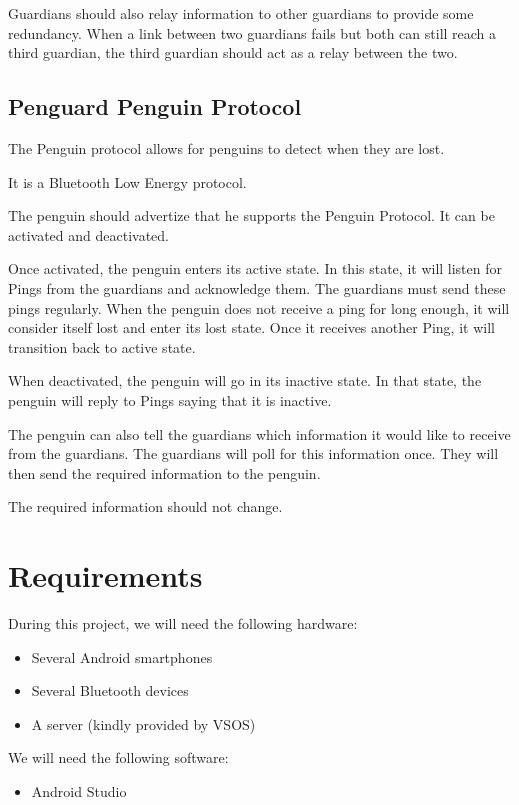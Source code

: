 \documentclass{report}
\begin{document}
Guardians should also relay information to other guardians to provide some redundancy. When a link between two guardians fails but both can still reach a third guardian, the third guardian should act as a relay between the two.

\subsection{Penguard Penguin Protocol}

The Penguin protocol allows for penguins to detect when they are lost.

It is a Bluetooth Low Energy protocol.

The penguin should advertize that he supports the Penguin Protocol. It can be activated and deactivated.

Once activated, the penguin enters its active state. In this state, it will listen for Pings from the guardians and acknowledge them. The guardians must send these pings regularly. When the penguin does not receive a ping for long enough, it will consider itself lost and enter its lost state. Once it receives another Ping, it will transition back to active state.

When deactivated, the penguin will go in its inactive state. In that state, the penguin will reply to Pings saying that it is inactive.

The penguin can also tell the guardians which information it would like to receive from the guardians. The guardians will poll for this information once. They will then send the required information to the penguin.

The required information should not change.

\section{Requirements}

During this project, we will need the following hardware:

\begin{itemize}
    \item Several Android smartphones
    \item Several Bluetooth devices
    \item A server (kindly provided by VSOS)
\end{itemize}

We will need the following software:

\begin{itemize}
    \item Android Studio
\end{itemize}
\end{document}
